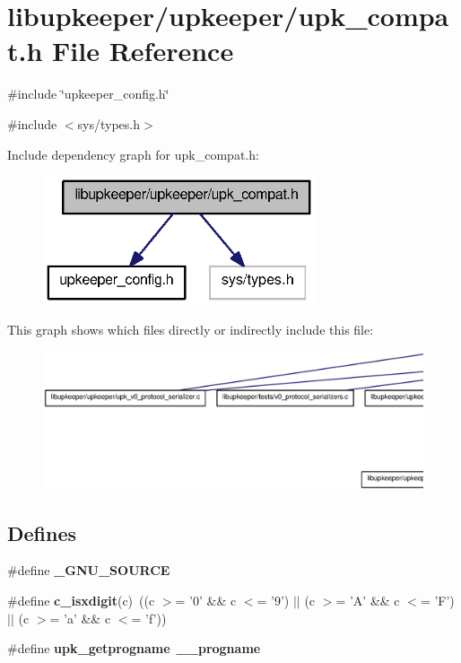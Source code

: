 \section{libupkeeper/upkeeper/upk\_\-compat.h File Reference}
\label{upk__compat_8h}
{\ttfamily \#include \char`\"{}upkeeper\_\-config.h\char`\"{}}\par
{\ttfamily \#include $<$sys/types.h$>$}\par
Include dependency graph for upk\_\-compat.h:\nopagebreak
\begin{figure}[H]
\begin{center}
\leavevmode
\includegraphics[width=227pt]{upk__compat_8h__incl}
\end{center}
\end{figure}
This graph shows which files directly or indirectly include this file:
\nopagebreak
\begin{figure}[H]
\begin{center}
\leavevmode
\includegraphics[width=400pt]{upk__compat_8h__dep__incl}
\end{center}
\end{figure}
\subsection*{Defines}
\begin{DoxyCompactItemize}
\item 
\#define {\bf \_\-GNU\_\-SOURCE}
\item 
\#define {\bf c\_\-isxdigit}(c)~((c $>$= '0' \&\& c $<$= '9') $|$$|$ (c $>$= 'A' \&\& c $<$= 'F') $|$$|$ (c $>$= 'a' \&\& c $<$= 'f'))
\item 
\#define {\bf upk\_\-getprogname}~{\bf \_\-\_\-progname}
\end{DoxyCompactItemize}
